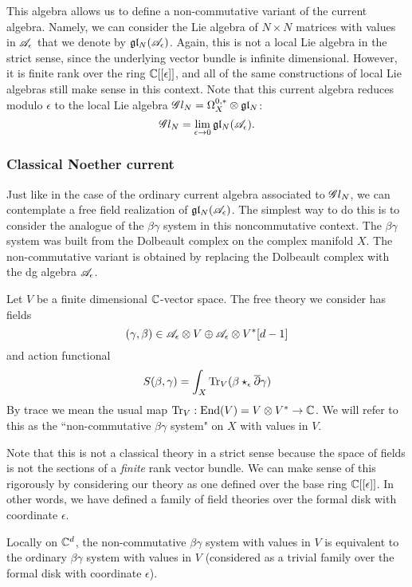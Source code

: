 This algebra allows us to define a non-commutative variant of the current algebra. 
Namely, we can consider the Lie algebra of $N \times N$ matrices with values in $\mathscr A_\epsilon$ that we denote by $\mathfrak{g} \mathfrak{l}_N(\mathscr A_{\epsilon})$. 
Again, this is not a local Lie algebra in the strict sense, since the underlying vector bundle is infinite dimensional. 
However, it is finite rank over the ring $\mathbb C[[\epsilon]]$, and all of the same constructions of local Lie algebras still make sense in this context. 
Note that this current algebra reduces modulo $\epsilon$ to the local Lie algebra $\mathscr G l_N = \Omega^{0,*}_X \otimes \mathfrak{g} \mathfrak{l}_N$:
\[
\mathscr G l_N = \lim_{\epsilon \to 0} \mathfrak{g} \mathfrak{l}_N(\mathscr A_{\epsilon})  .
\]

\subsubsection{Classical Noether current}

Just like in the case of the ordinary current algebra associated to $\mathscr G l_N$, we can contemplate a free field realization of $\mathfrak{g} \mathfrak{l}_N(\mathscr A_{\epsilon})$.
The simplest way to do this is to consider the analogue of the $\beta\gamma$ system in this noncommutative context. 
The $\beta\gamma$ system was built from the Dolbeault complex on the complex manifold $X$. 
The non-commutative variant is obtained by replacing the Dolbeault complex with the dg algebra $\mathscr A_\epsilon$. 

Let $V$ be a finite dimensional $\mathbb C$-vector space.
The free theory we consider has fields 
\[
(\gamma, \beta) \in \mathscr A_\epsilon \otimes V \oplus \mathscr A_\epsilon \otimes V^* [d-1] 
\]
and action functional
\[
S(\beta,\gamma) = \int_X {\rm Tr}_V(\beta \star_{\epsilon} \overline{\partial} \gamma)
\]
By trace we mean the usual map ${\rm Tr}_V : {\rm End}(V) = V \otimes V^* \to \mathbb C$. 
We will refer to this as the ``non-commutative $\beta\gamma$ system" on $X$ with values in $V$.

\begin{rmk}
Note that this is not a classical theory in a strict sense because the space of fields is not the sections of a {\em finite} rank vector bundle. 
We can make sense of this rigorously by considering our theory as one defined over the base ring $\mathbb C[[\epsilon]]$. 
In other words, we have defined a family of field theories over the formal disk with coordinate $\epsilon$. 
\end{rmk}

\begin{lem}\label{lem: nonbg}
Locally on $\mathbb C^d$, the non-commutative $\beta\gamma$ system with values in $V$ is equivalent to the ordinary $\beta\gamma$ system with values in $V$ (considered as a trivial family over the formal disk with coordinate $\epsilon$). 
\end{lem}

